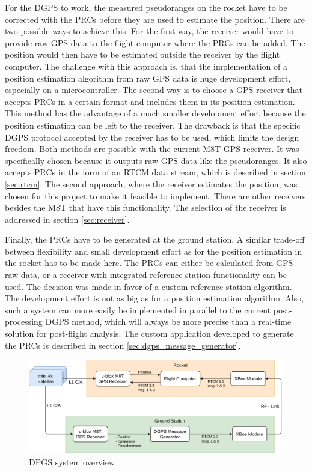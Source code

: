 For the DGPS to work, the measured pseudoranges on the rocket have to be corrected with the PRCs before they are used to estimate the position.
There are two possible ways to achieve this.
For the first way, the receiver would have to provide raw GPS data to the flight computer where the PRCs can be added.
The position would then have to be estimated outside the receiver by the flight computer.
The challenge with this approach is, that the implementation of a position estimation algorithm from raw GPS data is huge development effort, especially on a microcontroller.
The second way is to choose a GPS receiver that accepts PRCs in a certain format and includes them in its position estimation.
This method has the advantage of a much smaller development effort because the position estimation can be left to the receiver.
The drawback is that the specific DGPS protocol accepted by the receiver has to be used, which limits the design freedom.
Both methods are possible with the current M8T GPS receiver.
It was specifically chosen because it outputs raw GPS data like the pseudoranges.
It also accepts PRCs in the form of an RTCM data stream, which is described in section \ref{sec:rtcm}.
The second approach, where the receiver estimates the position, was chosen for this project to make it feasible to implement.
There are other receivers besides the M8T that have this functionality.
The selection of the receiver is addressed in section \ref{sec:receiver}.

Finally, the PRCs have to be generated at the ground station.
A similar trade-off between flexibility and small development effort as for the position estimation in the rocket has to be made here.
The PRCs can either be calculated from GPS raw data, or a receiver with integrated reference station functionality can be used.
The decision was made in favor of a custom reference station algorithm.
The development effort is not as big as for a position estimation algorithm.
Also, such a system can more easily be implemented in parallel to the current post-processing DGPS method, which will always be more precise than a real-time solution for post-flight analysis.
The custom application developed to generate the PRCs is described in section \ref{sec:dgps_message_generator}.

\begin{figure}[ht]
 \centering
 \includegraphics[width=\textwidth]{images/DGPS_System_Overview.png}
 \caption{DPGS system overview}
 \label{fig:dgps_system_overview}
\end{figure}

